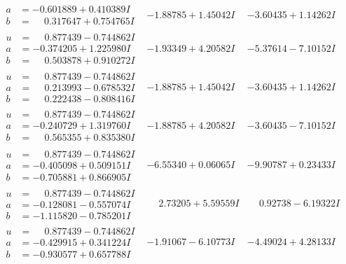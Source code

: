 \documentclass[1p]{elsarticle_modified}
\theoremstyle{definition}
\begin{document}
$$\begin{array}{c|c|c}
\begin{aligned}
a &= -0.601889 + 0.410389 I \\
b &= \phantom{-}0.317647 + 0.754765 I\end{aligned}
 & -1.88785 + 1.45042 I & -3.60435 + 1.14262 I \\ \hline\begin{aligned}
u &= \phantom{-}0.877439 - 0.744862 I \\
a &= -0.374205 + 1.225980 I \\
b &= \phantom{-}0.503878 + 0.910272 I\end{aligned}
 & -1.93349 + 4.20582 I & -5.37614 - 7.10152 I \\ \hline\begin{aligned}
u &= \phantom{-}0.877439 - 0.744862 I \\
a &= \phantom{-}0.213993 - 0.678532 I \\
b &= \phantom{-}0.222438 - 0.808416 I\end{aligned}
 & -1.88785 + 1.45042 I & -3.60435 + 1.14262 I \\ \hline\begin{aligned}
u &= \phantom{-}0.877439 - 0.744862 I \\
a &= -0.240729 + 1.319760 I \\
b &= \phantom{-}0.565355 + 0.835380 I\end{aligned}
 & -1.88785 + 4.20582 I & -3.60435 - 7.10152 I \\ \hline\begin{aligned}
u &= \phantom{-}0.877439 - 0.744862 I \\
a &= -0.405098 + 0.509151 I \\
b &= -0.705881 + 0.866905 I\end{aligned}
 & -6.55340 + 0.06065 I & -9.90787 + 0.23433 I \\ \hline\begin{aligned}
u &= \phantom{-}0.877439 - 0.744862 I \\
a &= -0.128081 - 0.557074 I \\
b &= -1.115820 - 0.785201 I\end{aligned}
 & \phantom{-}2.73205 + 5.59559 I & \phantom{-}0.92738 - 6.19322 I \\ \hline\begin{aligned}
u &= \phantom{-}0.877439 - 0.744862 I \\
a &= -0.429915 + 0.341224 I \\
b &= -0.930577 + 0.657788 I\end{aligned}
 & -1.91067 - 6.10773 I & -4.49024 + 4.28133 I\\

\end{array}$$
\end{document}
